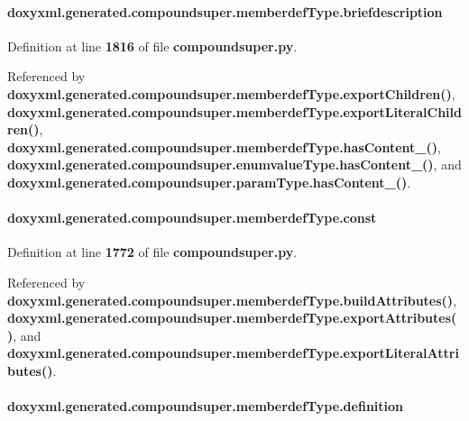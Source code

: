 \paragraph[{briefdescription}]{\setlength{\rightskip}{0pt plus 5cm}doxyxml.\+generated.\+compoundsuper.\+memberdef\+Type.\+briefdescription}\label{classdoxyxml_1_1generated_1_1compoundsuper_1_1memberdefType_a6958ad25cf9c23bad4a355a2da7f9e72}


Definition at line {\bf 1816} of file {\bf compoundsuper.\+py}.



Referenced by {\bf doxyxml.\+generated.\+compoundsuper.\+memberdef\+Type.\+export\+Children()}, {\bf doxyxml.\+generated.\+compoundsuper.\+memberdef\+Type.\+export\+Literal\+Children()}, {\bf doxyxml.\+generated.\+compoundsuper.\+memberdef\+Type.\+has\+Content\+\_\+()}, {\bf doxyxml.\+generated.\+compoundsuper.\+enumvalue\+Type.\+has\+Content\+\_\+()}, and {\bf doxyxml.\+generated.\+compoundsuper.\+param\+Type.\+has\+Content\+\_\+()}.

\paragraph[{const}]{\setlength{\rightskip}{0pt plus 5cm}doxyxml.\+generated.\+compoundsuper.\+memberdef\+Type.\+const}\label{classdoxyxml_1_1generated_1_1compoundsuper_1_1memberdefType_a804443fe40d445b1a49c1b9a8ce841fd}


Definition at line {\bf 1772} of file {\bf compoundsuper.\+py}.



Referenced by {\bf doxyxml.\+generated.\+compoundsuper.\+memberdef\+Type.\+build\+Attributes()}, {\bf doxyxml.\+generated.\+compoundsuper.\+memberdef\+Type.\+export\+Attributes()}, and {\bf doxyxml.\+generated.\+compoundsuper.\+memberdef\+Type.\+export\+Literal\+Attributes()}.

\paragraph[{definition}]{\setlength{\rightskip}{0pt plus 5cm}doxyxml.\+generated.\+compoundsuper.\+memberdef\+Type.\+definition}\label{classdoxyxml_1_1generated_1_1compoundsuper_1_1memberdefType_ab850e331475af7b4a7edee6acfc98c8f}


